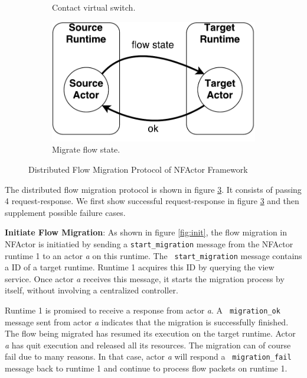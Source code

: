 \begin{figure}[!t]
\begin{subfigure}[t]{0.23\linewidth}
		\caption{Contact virtual switch.}\label{fig:second}
	 \end{subfigure}\hfill
	 \begin{subfigure}[t]{0.23\linewidth}
		\centering
		\includegraphics[width=\columnwidth]{figure/NFActor-Flow-Migration-Third.pdf}
		\caption{Migrate flow state.}\label{fig:third}
	 \end{subfigure}
\caption{Distributed Flow Migration Protocol of NFActor Framework}
\label{fig:migration}
\end{figure}

The distributed flow migration protocol is shown in figure \ref{fig:migration}.
It consists of passing 4 request-response. We first show successful
request-response in figure \ref{fig:migration} and then supplement possible
failure cases.

\textbf{Initiate Flow Migration}: As shown in figure \ref{fig:init}, the flow
migration in NFActor is initiatied by sending a {\tt start\_migration} message
from the NFActor runtime 1 to an actor \textit{a} on this runtime. The {\tt
start\_migration} message contains a ID of a target runtime. Runtime 1 acquires
this ID by querying the view service. Once actor \textit{a} receives this
message, it starts the migration process by itself, without involving a centralized controller.

Runtime 1 is promised to receive a response from actor \textit{a}. A {\tt
migration\_ok} message sent from actor \textit{a} indicates that the migration
is successfully finished. The flow being migrated has
resumed its execution on the target runtime. Actor \textit{a} has quit
execution and released all its resources. The migration can of course fail due
to many reasons. In that case, actor \textit{a} will respond a {\tt
migration\_fail} message back to runtime 1 and continue to process flow packets
on runtime 1.

